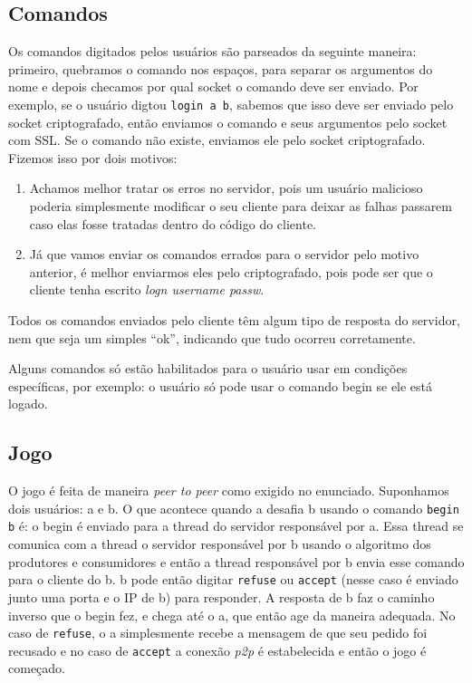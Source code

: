 \documentclass[12pt]{beamer}
\begin{document}
\subsection{Comandos}
\begin{frame}
  Os comandos digitados pelos usuários são parseados da seguinte maneira: primeiro, quebramos o comando nos espaços, para separar os argumentos do nome e depois checamos por qual socket o comando deve ser enviado. Por exemplo, se o usuário digtou \texttt{login a b}, sabemos que isso deve ser enviado pelo socket criptografado, então enviamos o comando e seus argumentos pelo socket com SSL. Se o comando não existe, enviamos ele pelo socket criptografado. Fizemos isso por dois motivos:
\end{frame}
\begin{frame}
  \begin{enumerate}
    \item Achamos melhor tratar os erros no servidor, pois um usuário malicioso poderia simplesmente modificar o seu cliente para deixar as falhas passarem caso elas fosse tratadas dentro do código do cliente.
    \item Já que vamos enviar os comandos errados para o servidor pelo motivo anterior, é melhor enviarmos eles pelo criptografado, pois pode ser que o cliente tenha escrito \textit{logn username passw}.
  \end{enumerate}
\end{frame}
\begin{frame}
  Todos os comandos enviados pelo cliente têm algum tipo de resposta do servidor, nem que seja um simples ``ok'', indicando que tudo ocorreu corretamente.
\end{frame}
\begin{frame}
  Alguns comandos só estão habilitados para o usuário usar em condições específicas, por exemplo: o usuário só pode usar o comando begin se ele está logado.
\end{frame}

\subsection{Jogo}
\begin{frame}
  O jogo é feita de maneira \textit{peer to peer} como exigido no enunciado. Suponhamos dois usuários: a e b. O que acontece quando a desafia b usando o comando \texttt{begin b} é: o begin é enviado para a thread do servidor responsável por a. Essa thread se comunica com a thread o servidor responsável por b usando o algoritmo dos produtores e consumidores e então a thread responsável por b envia esse comando para o cliente do b. b pode então digitar \texttt{refuse} ou \texttt{accept} (nesse caso é enviado junto uma porta e o IP de b) para responder. A resposta de b faz o caminho inverso que o begin fez, e chega até o a, que então age da maneira adequada. No caso de \texttt{refuse}, o a simplesmente recebe a mensagem de que seu pedido foi recusado e no caso de \texttt{accept} a conexão \textit{p2p} é estabelecida e então o jogo é começado.
\end{frame}
\end{document}
